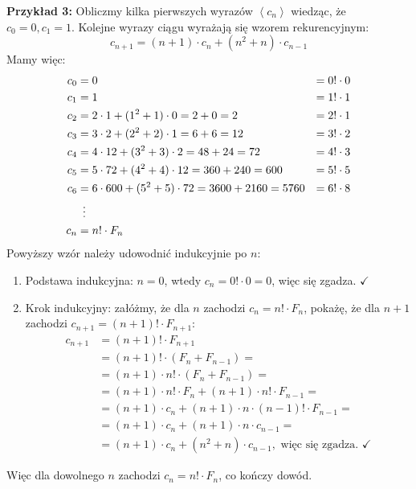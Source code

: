 \documentclass[a4paper,12pt]{article}
\newcommand{\sequence}[1]{\left\langle #1 \right\rangle} %
\begin{document}
\noindent \newline \textbf{Przykład 3:} Obliczmy kilka pierwszych wyrazów $\sequence{c_n}$ wiedząc, że $c_0 = 0, c_1 = 1$. Kolejne wyrazy ciągu wyrażają się wzorem rekurencyjnym: 
\[ c_{n+1} = (n+1) \cdot c_n + (n^2 + n) \cdot c_{n-1} \]
Mamy więc:
\begin{align*}
	c_0 &= 0 													&= 0! \cdot 0 \\
	c_1 &= 1 													&= 1! \cdot 1 \\
	c_2 &= 2\cdot 1 + (1^2 + 1) \cdot 0 = 2 + 0 = 2 			&= 2! \cdot 1 \\
	c_3 &= 3\cdot 2 + (2^2 + 2) \cdot 1 = 6 + 6 = 12 			&= 3! \cdot 2 \\
	c_4 &= 4\cdot 12 + (3^2 + 3) \cdot 2 = 48 + 24 = 72			&= 4! \cdot 3 \\
	c_5 &= 5\cdot 72 + (4^2 + 4) \cdot 12 = 360 + 240 = 600		&= 5! \cdot 5 \\
	c_6 &= 6\cdot 600 + (5^2 + 5) \cdot 72 = 3600 + 2160 = 5760 &= 6! \cdot 8 \\
		&\enskip \vdots \\
	c_n &= n! \cdot F_n
\end{align*}
Powyższy wzór należy udowodnić indukcyjnie po $n$:
\begin{enumerate}
	\item Podstawa indukcyjna: $n = 0$, wtedy $c_n = 0! \cdot 0 = 0$, więc się zgadza. $\checkmark$
	\item Krok indukcyjny: załóżmy, że dla $n$ zachodzi $c_n = n! \cdot F_n$, pokażę, że dla $n+1$ zachodzi $c_{n+1} = (n+1)! \cdot F_{n+1}$:
	\begin{align*}
		c_{n+1} &= (n + 1)! \cdot F_{n+1} \\
				&= (n + 1)! \cdot (F_n + F_{n-1}) = \\
				&= (n + 1) \cdot n! \cdot (F_n + F_{n-1}) = \\
				&= (n + 1) \cdot n! \cdot F_n + (n + 1) \cdot n! \cdot F_{n-1} = \\
				&= (n + 1) \cdot c_n + (n + 1) \cdot n \cdot (n - 1)! \cdot F_{n-1} = \\
				&= (n + 1) \cdot c_n + (n + 1) \cdot n \cdot c_{n-1} = \\
				&= (n + 1) \cdot c_n + (n^2 + n) \cdot c_{n-1}, \text{ więc się zgadza. } \checkmark
	\end{align*}
\end{enumerate}
Więc dla dowolnego $n$ zachodzi $c_n = n! \cdot F_n$, co kończy dowód.
\end{document}
